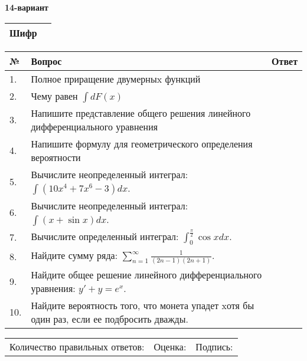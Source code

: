 \documentclass{article}
\begin{document}
  \egroup
  
  \newpage
  
  
  \textbf{14-вариант}\\
  
  \bgroup
  \def\arraystretch{1.6} %
  
  \begin{tabular}{|m{5.7cm}|m{9.5cm}|}
  \hline
  Шифр & \\
  \hline
  \end{tabular}
  
  \vspace{1cm}
  
  \begin{tabular}{|m{0.7cm}|m{10cm}|m{4cm}|}
  \hline
  № & Вопрос & Ответ \\
  \hline
  1. & Полное приращение двумерныx функций &  \\
  \hline
  2. & Чему равен \(\int{dF(x)}\) &  \\
  \hline
  3. & Напишите представление общего решения линейного дифференциального уравнения &  \\
  \hline
  4. & Напишите формулу для геометрического определения вероятности &  \\
  \hline
  5. & Вычислите неопределенный интеграл: \(\int{\left( 10x^{4} + 7x^{6} - 3 \right)dx}\). &  \\
  \hline
  6. & Вычислите неопределенный интеграл: \(\int{(x + \sin x)}dx\). &  \\
  \hline
  7. & Вычислите определенный интеграл: \(\int_{0}^{\frac{\pi}{2}}{\cos xdx}\). &  \\
  \hline
  8. & Найдите сумму ряда: \(\sum_{n = 1}^{\infty}\frac{1}{(2n - 1)(2n + 1)}\). &  \\
  \hline
  9. & Найдите общее решение линейного дифференциального уравнения: \(y' + y = e^{x}\). &  \\
  \hline
  10. & Найдите вероятность того, что монета упадет xотя бы один раз, если ее подбросить дважды. &  \\
  \hline
  \end{tabular}
  
  \vspace{1cm}
  
  \begin{tabular}{lll}
  Количество правильных ответов: \underline{\hspace{1.5cm}} & 
  Оценка: \underline{\hspace{1.5cm}} & 
  Подпись: \underline{\hspace{2cm}} \\
  \end{tabular}
  
\end{document}
